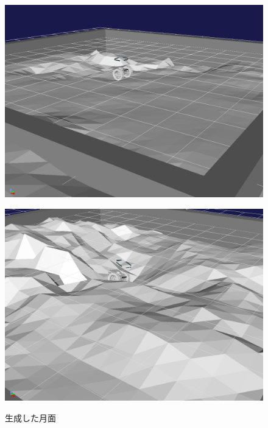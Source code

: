\documentclass[uplatex,twocolumn, dvipdfmx]{jsarticle}  %
\begin{document}
\begin{figure}[t]
  \centering
  \begin{minipage}[b]{0.47\linewidth}
    \centering
    \includegraphics[keepaspectratio, scale=0.1]{images/generate_field3.png}
    \label{fig:generate_field3}
  \end{minipage}
  \begin{minipage}[b]{0.47\linewidth}
    \centering
    \includegraphics[keepaspectratio, scale=0.096]{images/generate_field4.png}
    \label{fig:generate_field4}
  \end{minipage}
  \caption{生成した月面}
\end{figure}
\end{document}

